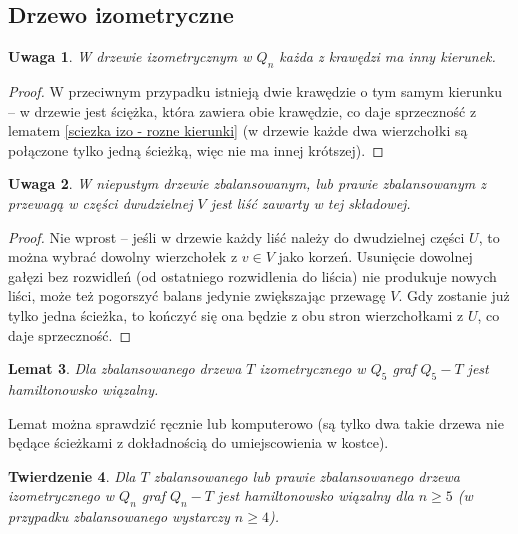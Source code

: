 \documentclass{pracamgr}
\newtheorem{theorem}{Twierdzenie}
\newtheorem{lemma}[theorem]{Lemat}
\newtheorem{remark}[theorem]{Uwaga}
\begin{document}
   \subsection{Drzewo izometryczne}
    \begin{remark}\label{drzewo izo - kierunek tylko raz}
     W drzewie izometrycznym w $Q_n$ każda z krawędzi ma inny kierunek.
    \end{remark}
    \begin{proof}
     W przeciwnym przypadku istnieją dwie krawędzie o tym samym kierunku -- w drzewie jest ściężka, która zawiera obie krawędzie, co daje sprzeczność z lematem
     \ref{sciezka izo - rozne kierunki} (w drzewie każde dwa wierzchołki są połączone tylko jedną ścieżką, więc nie ma innej krótszej).
    \end{proof}
    \begin{remark}\label{drzewo izo zbal - ma liść z V}
     W niepustym drzewie zbalansowanym, lub prawie zbalansowanym z przewagą w części dwudzielnej $V$ jest liść zawarty w tej składowej.
    \end{remark}
    \begin{proof}
     Nie wprost -- jeśli w drzewie każdy liść należy do dwudzielnej części $U$, to można wybrać dowolny wierzchołek z $v\in V$ jako korzeń.
     Usunięcie dowolnej gałęzi bez rozwidleń (od ostatniego rozwidlenia do liścia) nie produkuje nowych liści, może też pogorszyć balans jedynie
     zwiększając przewagę $V$. Gdy zostanie już tylko jedna ścieżka, to kończyć się ona będzie z obu stron wierzchołkami z $U$, co daje sprzeczność.
    \end{proof}
    \begin{lemma}\label{Q_5-izo tree hamilton}
     Dla zbalansowanego drzewa $T$ izometrycznego w $Q_5$ graf $Q_5-T$ jest hamiltonowsko wiązalny.
    \end{lemma}
    Lemat można sprawdzić ręcznie lub komputerowo (są tylko dwa takie drzewa nie będące ścieżkami z dokładnością do umiejscowienia w kostce).
    \begin{theorem}\label{Hamilton - drzewo izo}
     Dla $T$ zbalansowanego lub prawie zbalansowanego drzewa izometrycznego w $Q_n$ graf $Q_n-T$ jest hamiltonowsko wiązalny dla $n\ge5$
     (w przypadku zbalansowanego wystarczy $n\ge4$).
    \end{theorem}
\end{document}

